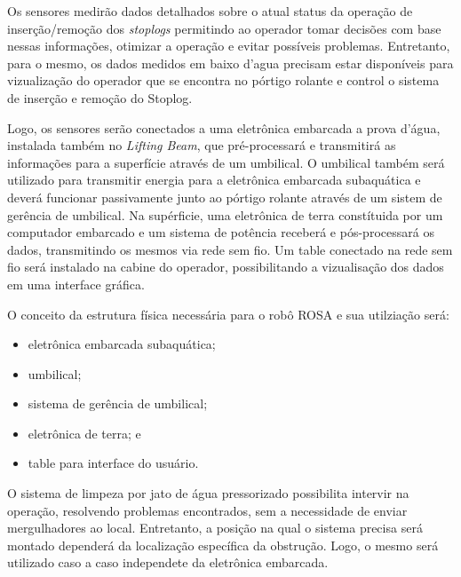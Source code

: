 Os sensores medirão dados detalhados sobre o atual status da
operação de inserção/remoção dos \emph{stoplogs} permitindo ao operador tomar decisões
com base nessas informações, otimizar a operação e evitar possíveis problemas.
Entretanto, para o mesmo, os dados medidos em baixo d'agua precisam estar disponíveis para vizualização do operador que se encontra no pórtigo rolante e control o sistema de inserção e remoção do Stoplog. 

Logo, os sensores serão conectados a uma eletrônica embarcada a prova d'água,
instalada também no \emph{Lifting Beam}, que pré-processará e transmitirá as
informações para a superfície através de um umbilical. 
O umbilical também será utilizado para transmitir energia para a eletrônica embarcada subaquática e deverá funcionar passivamente junto ao pórtigo rolante através de um sistem de gerência de umbilical. 
Na supérficie, uma eletrônica de terra constítuida por um computador embarcado e um sistema de potência receberá e pós-processará os dados, transmitindo os mesmos via rede sem fio. 
Um table conectado na rede sem fio será instalado na cabine do operador, possibilitando a vizualisação dos dados em uma interface gráfica.

O conceito da estrutura física necessária para o robô ROSA e sua utilziação será: 

\begin{itemize}

	\item eletrônica embarcada subaquática; 
	\item umbilical;
	\item sistema de gerência de umbilical;
	\item eletrônica de terra; e
	\item table para interface do usuário. 

\end{itemize}

O sistema de limpeza por jato de água pressorizado possibilita intervir na operação, resolvendo problemas encontrados, sem a necessidade de enviar mergulhadores ao local. Entretanto, a posição na qual o sistema  precisa será montado dependerá da localização específica da obstrução. Logo, o mesmo será utilizado caso a caso independete da eletrônica embarcada. 


